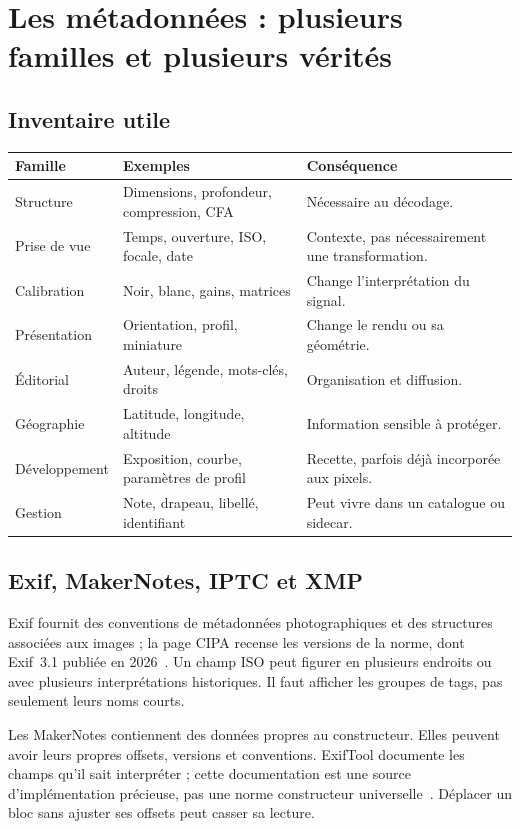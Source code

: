 \section{Les métadonnées : plusieurs familles et plusieurs vérités}
\subsection{Inventaire utile}
\begin{longtable}{p{3.1cm}p{6.5cm}p{5cm}}
\toprule Famille & Exemples & Conséquence \\ \midrule
Structure & Dimensions, profondeur, compression, CFA & Nécessaire au décodage. \\
Prise de vue & Temps, ouverture, ISO, focale, date & Contexte, pas nécessairement une transformation. \\
Calibration & Noir, blanc, gains, matrices & Change l'interprétation du signal. \\
Présentation & Orientation, profil, miniature & Change le rendu ou sa géométrie. \\
Éditorial & Auteur, légende, mots-clés, droits & Organisation et diffusion. \\
Géographie & Latitude, longitude, altitude & Information sensible à protéger. \\
Développement & Exposition, courbe, paramètres de profil & Recette, parfois déjà incorporée aux pixels. \\
Gestion & Note, drapeau, libellé, identifiant & Peut vivre dans un catalogue ou sidecar. \\
\bottomrule
\end{longtable}

\subsection{Exif, MakerNotes, IPTC et XMP}
Exif fournit des conventions de métadonnées photographiques
et des structures associées aux images ; la page CIPA
recense les versions de la norme, dont Exif~3.1 publiée
en 2026~\cite{exif}. Un champ ISO peut figurer en plusieurs
endroits ou avec plusieurs interprétations historiques.
Il faut afficher les groupes de tags, pas seulement leurs
noms courts.

Les MakerNotes contiennent des données propres au
constructeur. Elles peuvent avoir leurs propres offsets,
versions et conventions. ExifTool documente les champs
qu'il sait interpréter ; cette documentation est une
source d'implémentation précieuse, pas une norme constructeur
universelle~\cite{exiftoolimages}. Déplacer un bloc sans
ajuster ses offsets peut casser sa lecture.

